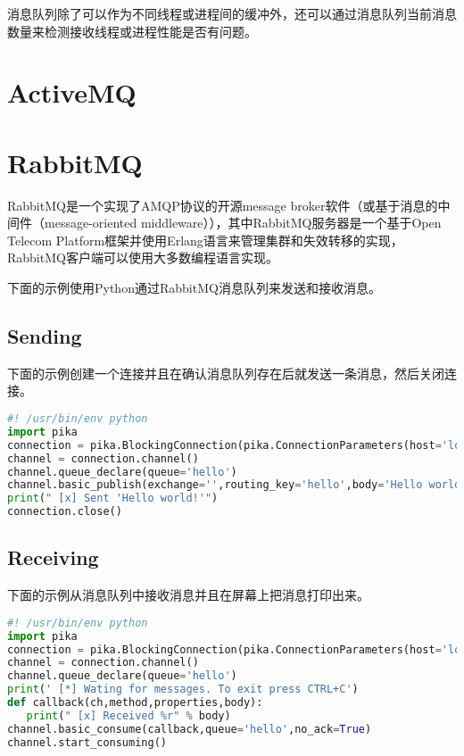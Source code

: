 消息队列除了可以作为不同线程或进程间的缓冲外，还可以通过消息队列当前消息数量来检测接收线程或进程性能是否有问题。

\chapter{ActiveMQ}





\chapter{RabbitMQ}

RabbitMQ是一个实现了AMQP协议的开源message broker软件（或基于消息的中间件（message-oriented middleware）），其中RabbitMQ服务器是一个基于Open Telecom Platform框架并使用Erlang语言来管理集群和失效转移的实现，RabbitMQ客户端可以使用大多数编程语言实现。


下面的示例使用Python通过RabbitMQ消息队列来发送和接收消息。

\section{Sending}

下面的示例创建一个连接并且在确认消息队列存在后就发送一条消息，然后关闭连接。


\begin{lstlisting}[language=Python]
#! /usr/bin/env python
import pika
connection = pika.BlockingConnection(pika.ConnectionParameters(host='localhost'))
channel = connection.channel()
channel.queue_declare(queue='hello')
channel.basic_publish(exchange='',routing_key='hello',body='Hello world!')
print(" [x] Sent 'Hello world!'")
connection.close()
\end{lstlisting}

\section{Receiving}

下面的示例从消息队列中接收消息并且在屏幕上把消息打印出来。


\begin{lstlisting}[language=Python]
#! /usr/bin/env python
import pika
connection = pika.BlockingConnection(pika.ConnectionParameters(host='localhost'))
channel = connection.channel()
channel.queue_declare(queue='hello')
print(' [*] Wating for messages. To exit press CTRL+C')
def callback(ch,method,properties,body):
   print(" [x] Received %r" % body)
channel.basic_consume(callback,queue='hello',no_ack=True)
channel.start_consuming()
\end{lstlisting}


